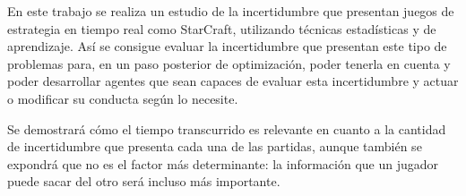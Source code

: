 En este trabajo se realiza un estudio de la incertidumbre que presentan juegos
de estrategia en tiempo real como StarCraft, utilizando técnicas estadísticas
y de aprendizaje. Así se consigue evaluar la incertidumbre
que presentan este tipo de problemas para, en un paso posterior de optimización,
poder tenerla en cuenta y poder desarrollar agentes que sean capaces de evaluar
esta incertidumbre y actuar o modificar su conducta según lo necesite.

Se demostrará cómo el tiempo transcurrido es relevante en cuanto a la cantidad
de incertidumbre que presenta cada una de las partidas, aunque también se
expondrá que no es el factor más determinante: la información que un jugador
puede sacar del otro será incluso más importante.
